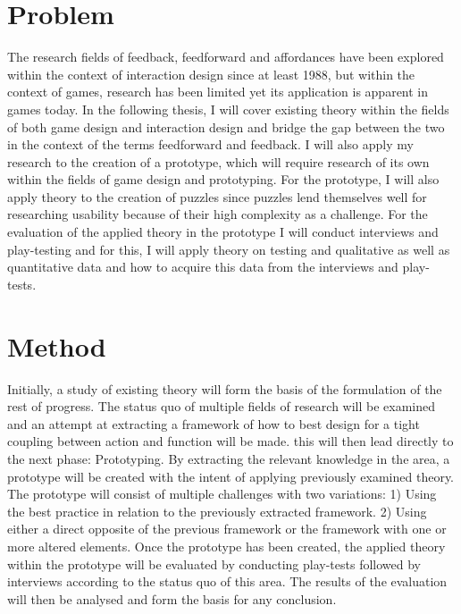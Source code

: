 \section*{Problem}
The research fields of feedback, feedforward and affordances have been explored within the context of interaction design since at least 1988, but within the context of games, research has been limited yet its application is apparent in games today. In the following thesis, I will cover existing theory within the fields of both game design and interaction design and bridge the gap between the two in the context of the terms feedforward and feedback. I will also apply my research to the creation of a prototype, which will require research of its own within the fields of game design and prototyping. For the prototype, I will also apply theory to the creation of puzzles since puzzles lend themselves well for researching usability because of their high complexity as a challenge. For the evaluation of the applied theory in the prototype I will conduct interviews and play-testing and for this, I will apply theory on testing and qualitative as well as quantitative data and how to acquire this data from the interviews and play-tests.

\section*{Method}
Initially, a study of existing theory will form the basis of the formulation of the rest of progress. The status quo of multiple fields of research will be examined and an attempt at extracting a framework of how to best design for a tight coupling between action and function will be made. this will then lead directly to the next phase: Prototyping. By extracting the relevant knowledge in the area, a prototype will be created with the intent of applying previously examined theory. The prototype will consist of multiple challenges with two variations: 1) Using the best practice in relation to the previously extracted framework. 2) Using either a direct opposite of the previous framework or the framework with one or more altered elements. Once the prototype has been created, the applied theory within the prototype will be evaluated by conducting play-tests followed by interviews according to the status quo of this area. The results of the evaluation will then be analysed and form the basis for any conclusion.
